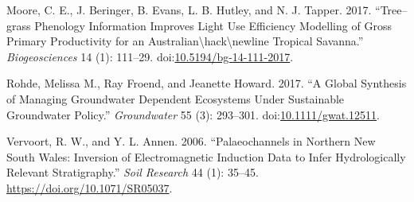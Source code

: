 \documentclass[]{elsarticle} %
\begin{document}
\hypertarget{ref-moore_treegrass_2017}{}
Moore, C. E., J. Beringer, B. Evans, L. B. Hutley, and N. J. Tapper.
2017. ``Tree--grass Phenology Information Improves Light Use Efficiency
Modelling of Gross Primary Productivity for an
Australian\textbackslash{}hack\textbackslash{}newline Tropical
Savanna.'' \emph{Biogeosciences} 14 (1): 111--29.
doi:\href{https://doi.org/10.5194/bg-14-111-2017}{10.5194/bg-14-111-2017}.

\hypertarget{ref-rohde_global_2017}{}
Rohde, Melissa M., Ray Froend, and Jeanette Howard. 2017. ``A Global
Synthesis of Managing Groundwater Dependent Ecosystems Under Sustainable
Groundwater Policy.'' \emph{Groundwater} 55 (3): 293--301.
doi:\href{https://doi.org/10.1111/gwat.12511}{10.1111/gwat.12511}.

\hypertarget{ref-vervoort_palaeochannels_2006}{}
Vervoort, R. W., and Y. L. Annen. 2006. ``Palaeochannels in Northern New
South Wales: Inversion of Electromagnetic Induction Data to Infer
Hydrologically Relevant Stratigraphy.'' \emph{Soil Research} 44 (1):
35--45. \url{https://doi.org/10.1071/SR05037}.
\end{document}
